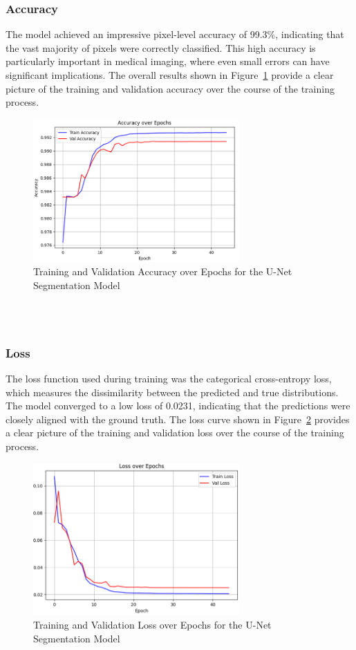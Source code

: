 \subsubsection{Accuracy}
The model achieved an impressive pixel-level accuracy of 99.3\%, indicating that the vast majority of pixels were correctly classified. This high accuracy is particularly important in medical imaging, where even small errors can have significant implications. The overall results shown in Figure~\ref{fig:unet-acc} provide a clear picture of the training and validation accuracy over the course of the training process.
\begin{figure}[ht]
  \centering
  \includegraphics[width=0.7\textwidth]{Images/Chapter3/unet_acc.png}
  \caption{Training and Validation Accuracy over Epochs for the U-Net Segmentation Model}
  \label{fig:unet-acc}
\end{figure}
\\
\\
\subsubsection{Loss}
The loss function used during training was the categorical cross-entropy loss, which measures the dissimilarity between the predicted and true distributions. The model converged to a low loss of 0.0231, indicating that the predictions were closely aligned with the ground truth. The loss curve shown in Figure~\ref{fig:unet-loss} provides a clear picture of the training and validation loss over the course of the training process.

\begin{figure}[h]
  \centering
  \includegraphics[width=0.7\textwidth]{Images/Chapter3/unet_loss.png}
  \caption{Training and Validation Loss over Epochs for the U-Net Segmentation Model}
  \label{fig:unet-loss}
\end{figure}

